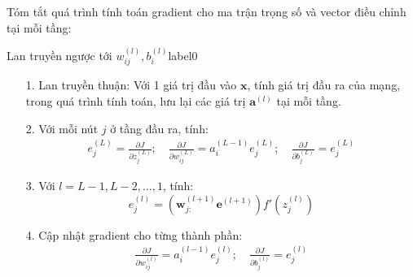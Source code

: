 Tóm tắt quá trình tính toán gradient cho ma trận trọng số và vector điều chỉnh tại mỗi tầng:
 
 
 
 
\begin{myalg}{{Lan truyền ngược tới} $w_{ij}^{(l)},
b_{i}^{(l)}$}{label0}
\begin{enumerate}
    \item[1.] Lan truyền thuận: Với 1 giá trị đầu vào $\mathbf{x}$, tính giá trị đầu
    ra của mạng, trong quá trình tính toán, lưu lại các giá trị $\mathbf{a}^{(l)}$ tại mỗi tầng.
    \item[2.] Với mỗi nút $j$ ở tầng đầu ra, tính:
    \begin{eqnarray} 
    e_j^{(L)} = \frac{\partial J}{\partial z_j^{(L)}}; \quad 
    \frac{\partial J}{\partial w_{ij}^{(L)}} = a_i^{(L-1)}e_j^{(L)}; \quad  
    \frac{\partial J}{\partial b_{j}^{(L)}} = e_j^{(L)} 
    \end{eqnarray} 

    \item[3.]  Với $l = L-1, L-2, ..., 1$, tính: 
    \begin{equation} 
    e_j^{(l)} = \left( \mathbf{w}_{j:}^{(l+1)} \mathbf{e}^{(l+1)} \right) f'(z_j^{(l)}) 
    \end{equation} 

    \item[4.] Cập nhật gradient cho từng thành phần:
    \begin{eqnarray} 
    \frac{\partial J}{\partial w_{ij}^{(l)}} = a_i^{(l-1)} e_j^{(l)}; \quad 
    \frac{\partial J}{\partial b_{j}^{(l)}} = e_j^{(l)} 
    \end{eqnarray} 
\end{enumerate}
\end{myalg}
 
 
 
